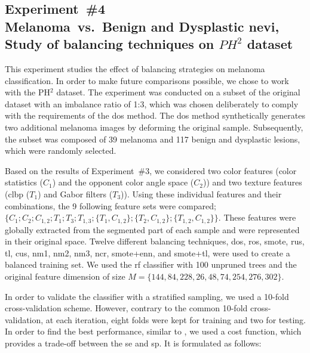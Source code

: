 \subsection{Experiment~\#4\\
\small{Melanoma~vs.~Benign and Dysplastic nevi, Study of balancing techniques on $PH^{2}$ dataset}}
\label{subsec:chp3-exp4}
This experiment studies the effect of balancing strategies on melanoma classification.
In order to make future comparisons possible, we chose to work with the PH$^{2}$ dataset. 
The experiment was conducted on a subset of the original dataset with an imbalance ratio of 1:3, which was chosen deliberately to comply with the requirements of the \ac{dos} method.
The \ac{dos} method synthetically generates two additional melanoma images by deforming the original sample. 
Subsequently, the subset was composed of 39 melanoma and 117 benign and dysplastic lesions, which were randomly selected.

Based on the results of Experiment~\#3, we considered two color features (color statistics ($C_{1}$) and the opponent color angle space ($C_{2}$)) and two texture features (\ac{clbp} ($T_{1}$) and  Gabor filters ($T_{3}$)).
Using these individual features and their combinations, the 9 following feature sets were compared; $\{ C_{1}; C_{2}; C_{1,2}; T_{1}; T_{3}; T_{1,3}; \{T_{1}, C_{1,2}\}; \{T_{2}, C_{1,2}\}; \{T_{1,2}, C_{1,2}\}\}$.
These features were globally extracted from the segmented part of each sample and were represented in their original space.
Twelve different balancing techniques, \ac{dos}, \ac{ros}, \ac{smote}, \ac{rus}, \ac{tl}, \ac{cus}, \ac{nm1}, \ac{nm2}, \ac{nm3}, \ac{ncr}, \ac{smote}+\ac{enn}, and \ac{smote}+\ac{tl}, were used to create a balanced training set.
We used the \ac{rf} classifier with 100 unpruned trees and the original feature dimension of size $M = \{144, 84, 228, 26, 48, 74, 254, 276, 302\}$.

In order to validate the classifier with a stratified sampling, we used a 10-fold cross-validation scheme.
However, contrary to the common 10-fold cross-validation, at each iteration, eight folds were kept for training and two for testing. 
In order to find the best performance, similar to \cite{barata2013towards}, we used a cost function, which provides a trade-off between the \ac{se} and \ac{sp}.
It is formulated as follows:

